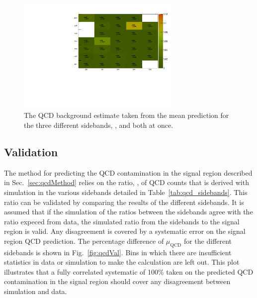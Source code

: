 \clearpage
\begin{figure}[!t]
  \centering
  \includegraphics[width=0.7\textwidth]{figures/qcd/newMethod/meanPredictedQcdDivEwk_Signal}
  \caption{The QCD background estimate taken from the mean prediction
  for the three different sidebands, \bdphi, \mhtmet and both at
  once.}
  \label{fig:qcd_estimate}
\end{figure}



\clearpage
\subsection{Validation}
\label{sec:qcdValidation}

The method for predicting the QCD contamination in the signal region
described in Sec.~\ref{sec:qcdMethod} relies on the ratio, \rmhtmet,
of QCD counts that is derived with simulation in the various sidebands
detailed in Table~\ref{tab:qcd_sidebands}.  This ratio can be
validated by comparing the results of the different sidebands.  It is
assumed that if the simulation of the ratios between the sidebands
agree with the ratio expeced from data, the simulated ratio from the
sidebands to the signal region is valid. Any disagreement is covered
by a systematic error on the signal region QCD prediction. The
percentage difference of $\mu_{\textrm{QCD}}$ for the different
sidebands is shown in Fig.~\ref{fig:qcdVal}. Bins in which there are
insufficient statistics in data or simulation to make the calculation
are left out.  This plot illustrates that a fully correlated
systematic of 100\% taken on the predicted QCD contamination in the
signal region should cover any disagreement between simulation and
data.


